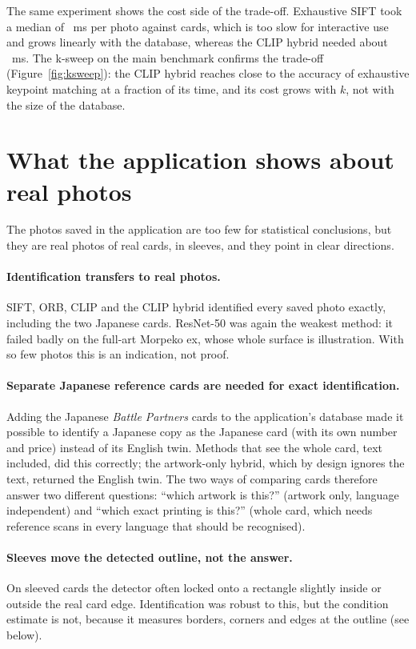 The same experiment shows the cost side of the trade-off. Exhaustive SIFT took a median of ~ms per photo against  cards, which is too slow for interactive use and grows linearly with the database, whereas the CLIP hybrid needed about ~ms. The k-sweep on the main benchmark confirms the trade-off (Figure~\ref{fig:ksweep}): the CLIP hybrid reaches close to the accuracy of exhaustive keypoint matching at a fraction of its time, and its cost grows with $k$, not with the size of the database.

\section{What the application shows about real photos}
\label{sec:disc-app}

The  photos saved in the application are too few for statistical conclusions, but they are real photos of real cards, in sleeves, and they point in clear directions.

\paragraph{Identification transfers to real photos.} SIFT, ORB, CLIP and the CLIP hybrid identified every saved photo exactly, including the two Japanese cards. ResNet-50 was again the weakest method: it failed badly on the full-art Morpeko ex, whose whole surface is illustration. With so few photos this is an indication, not proof.

\paragraph{Separate Japanese reference cards are needed for exact identification.} Adding the Japanese \emph{Battle Partners} cards to the application's database made it possible to identify a Japanese copy as the Japanese card (with its own number and price) instead of its English twin. Methods that see the whole card, text included, did this correctly; the artwork-only hybrid, which by design ignores the text, returned the English twin. The two ways of comparing cards therefore answer two different questions: ``which artwork is this?'' (artwork only, language independent) and ``which exact printing is this?'' (whole card, which needs reference scans in every language that should be recognised).

\paragraph{Sleeves move the detected outline, not the answer.} On sleeved cards the detector often locked onto a rectangle slightly inside or outside the real card edge. Identification was robust to this, but the condition estimate is not, because it measures borders, corners and edges at the outline (see below).


